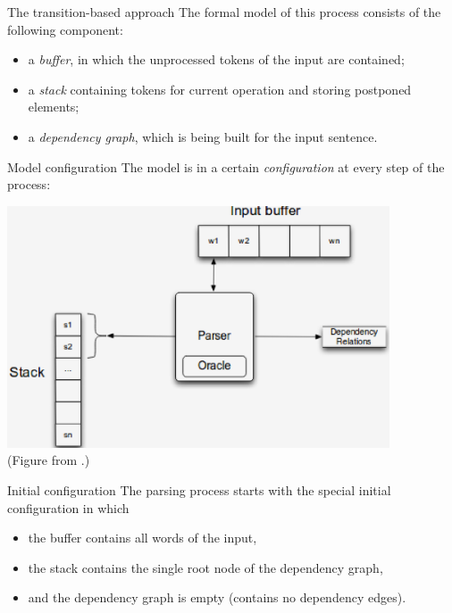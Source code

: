 \documentclass[style=upen, size=14pt]{powerdot}
\newcommand{\gold}{\color{arany}}
\theoremstyle{definition}
\begin{document}
\begin{slide}[toc=]{The transition-based approach}
  The formal model of this process consists of the following component:
  \begin{itemize}
  \item a \emph{\gold buffer}, in which the unprocessed tokens of the input are contained;
  \item a \emph{\gold stack} containing tokens for current operation and storing postponed
    elements;
  \item a \emph{\gold dependency graph}, which is being built for the input
    sentence.
  \end{itemize}
\end{slide}

\begin{slide}[toc=Configurations]{Model configuration}
  The model is in a certain \emph{\gold configuration} at every step of the
  process:
  \begin{center}
    \includegraphics[width=0.85\textwidth]{figures/transition_config.eps}\\
    \footnotesize{(Figure from \citet[ch. 15]{jurafsky2019speech}.)}
  \end{center}
\end{slide}

\begin{slide}[toc=Initial config]{Initial configuration}
  The parsing process starts with the special initial configuration in which
  \begin{itemize}
  \item the buffer contains all words of the input,
  \item the stack contains the single root node of the dependency graph,
  \item and the dependency graph is empty (contains no dependency edges).
  \end{itemize}
\end{slide}
\end{document}
